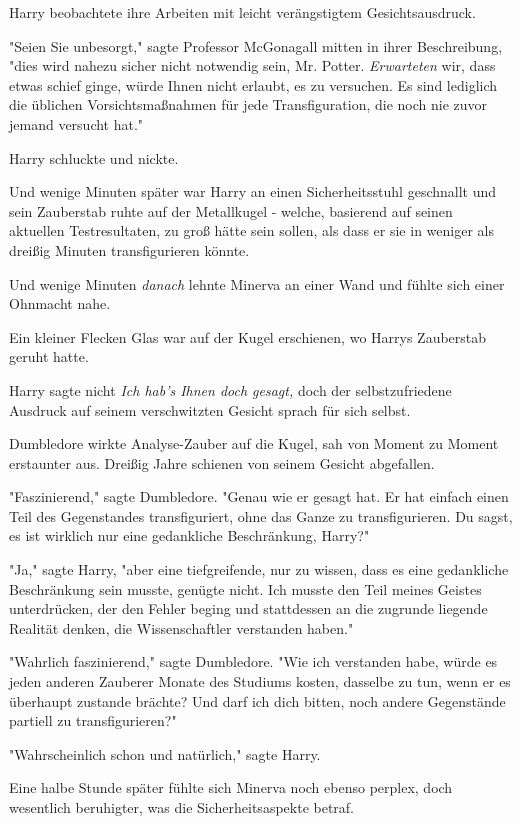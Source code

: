 {Harry beobachtete ihre Arbeiten mit leicht verängstigtem Gesichtsausdruck.

"Seien Sie unbesorgt," sagte Professor McGonagall mitten in ihrer Beschreibung, "dies wird nahezu sicher nicht notwendig sein, Mr. Potter. \emph{Erwarteten} wir, dass etwas schief ginge, würde Ihnen nicht erlaubt, es zu versuchen. Es sind lediglich die üblichen Vorsichtsmaßnahmen für jede Transfiguration, die noch nie zuvor jemand versucht hat."

Harry schluckte und nickte.

Und wenige Minuten später war Harry an einen Sicherheitsstuhl geschnallt und sein Zauberstab ruhte auf der Metallkugel - welche, basierend auf seinen aktuellen Testresultaten, zu groß hätte sein sollen, als dass er sie in weniger als dreißig Minuten transfigurieren könnte.

Und wenige Minuten \emph{danach} lehnte Minerva an einer Wand und fühlte sich einer Ohnmacht nahe.

Ein kleiner Flecken Glas war auf der Kugel erschienen, wo Harrys Zauberstab geruht hatte.

Harry sagte nicht \emph{Ich hab's Ihnen doch gesagt,} doch der selbstzufriedene Ausdruck auf seinem verschwitzten Gesicht sprach für sich selbst.

Dumbledore wirkte Analyse-Zauber auf die Kugel, sah von Moment zu Moment erstaunter aus. Dreißig Jahre schienen von seinem Gesicht abgefallen.

"Faszinierend," sagte Dumbledore. "Genau wie er gesagt hat. Er hat einfach einen Teil des Gegenstandes transfiguriert, ohne das Ganze zu transfigurieren. Du sagst, es ist wirklich nur eine gedankliche Beschränkung, Harry?"

"Ja," sagte Harry, "aber eine tiefgreifende, nur zu wissen, dass es eine gedankliche Beschränkung sein musste, genügte nicht. Ich musste den Teil meines Geistes unterdrücken, der den Fehler beging und stattdessen an die zugrunde liegende Realität denken, die Wissenschaftler verstanden haben."

"Wahrlich faszinierend," sagte Dumbledore. "Wie ich verstanden habe, würde es jeden anderen Zauberer Monate des Studiums kosten, dasselbe zu tun, wenn er es überhaupt zustande brächte? Und darf ich dich bitten, noch andere Gegenstände partiell zu transfigurieren?"

"Wahrscheinlich schon und natürlich," sagte Harry.

Eine halbe Stunde später fühlte sich Minerva noch ebenso perplex, doch wesentlich beruhigter, was die Sicherheitsaspekte betraf.

}

